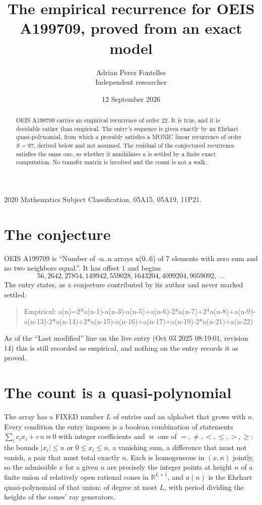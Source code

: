 \documentclass[11pt,a4paper]{article}
\title{The empirical recurrence for OEIS A199709, proved from an exact model}
\author{Adrian Perez Fontelles\\ \small Independent researcher}
\date{12 September 2026}
\theoremstyle{plain}
\theoremstyle{definition}
\begin{document}
\maketitle

\begin{abstract}
OEIS A199709 carries an empirical recurrence of order $22$. It is true, and it is
decidable rather than empirical. The entry's sequence is given exactly by an Ehrhart quasi-polynomial, from
which $a$ provably satisfies a MONIC linear recurrence of order $S=97$, derived below and not
assumed. The residual of the conjectured recurrence satisfies the same one, so whether it
annihilates $a$ is settled by a finite exact computation. No transfer matrix is involved and
the count is not a walk.
\end{abstract}

\noindent\small 2020 Mathematics Subject Classification. 05A15, 05A19, 11P21.\normalsize

\section{The conjecture}

OEIS A199709 is ``Number of -n..n arrays x(0..6) of 7 elements with zero sum and no two neighbors equal.''. It has offset $1$ and begins
\[
56, 2642, 27854, 149942, 559028, 1643204, 4099204, 9059092,\ \dots
\]
The entry states, as a conjecture contributed by its author and never marked settled:
\begin{quote}
Empirical: a(n)=2*a(n-1)-a(n-3)-a(n-5)+a(n-6)-2*a(n-7)+2*a(n-8)+a(n-9)-a(n-13)-2*a(n-14)+2*a(n-15)-a(n-16)+a(n-17)+a(n-19)-2*a(n-21)+a(n-22)
\end{quote}
As of the ``Last modified'' line on the live entry (Oct 03 2025 08:19:01, revision 14)
this is still recorded as empirical, and nothing on the entry records it as proved.

\section{The count is a quasi-polynomial}

The array has a FIXED number $L$ of entries and an alphabet that grows with $n$. Every
condition the entry imposes is a boolean combination of statements
$\sum_i c_ix_i + c\,n \bowtie 0$ with integer coefficients and $\bowtie$ one of
$=,\ne,<,\le,>,\ge$: the bounds $|x_i|\le n$ or $0\le x_i\le n$, a vanishing sum, a difference
that must not vanish, a pair that must total exactly $n$. Each is homogeneous in $(x,n)$
jointly, so the admissible $x$ for a given $n$ are precisely the integer points at height $n$
of a finite union of relatively open rational cones in $\mathbb{R}^{L+1}$, and $a(n)$ is
the Ehrhart quasi-polynomial of that union: of degree at most $L$, with period dividing the
heights of the cones' ray generators.
\end{document}
